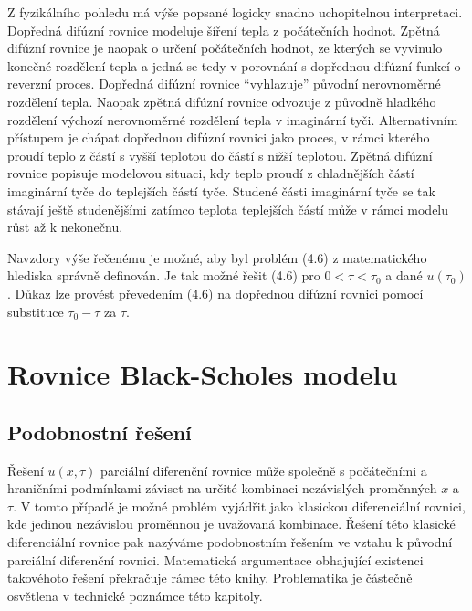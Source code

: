 \documentclass[a4paper]{book}
\begin{document}
Z fyzikálního pohledu má výše popsané logicky snadno uchopitelnou interpretaci. Dopředná difúzní rovnice modeluje šíření tepla z počátečních hodnot. Zpětná difúzní rovnice je naopak o určení počátečních hodnot, ze kterých se vyvinulo konečné rozdělení tepla a jedná se tedy v porovnání s dopřednou difúzní funkcí o reverzní proces. Dopředná difúzní rovnice ``vyhlazuje'' původní nerovnoměrné rozdělení tepla. Naopak zpětná difúzní rovnice odvozuje z původně hladkého rozdělení výchozí nerovnoměrné rozdělení tepla v imaginární tyči. Alternativním přístupem je chápat dopřednou difúzní rovnici jako proces, v rámci kterého proudí teplo z částí s vyšší teplotou do částí s nižší teplotou. Zpětná difúzní rovnice popisuje modelovou situaci, kdy teplo proudí z chladnějších částí imaginární tyče do teplejších částí tyče. Studené části imaginární tyče se tak stávají ještě studenějšími zatímco teplota teplejších částí může v rámci modelu růst až k nekonečnu.

Navzdory výše řečenému je možné, aby byl problém (4.6) z matematického hlediska správně definován. Je tak možné řešit (4.6) pro $0 < \tau < \tau_0$ a dané $u(\tau_0)$. Důkaz lze provést převedením (4.6) na dopřednou difúzní rovnici pomocí substituce $\tau_0 - \tau$ za $\tau$. 

\chapter{Rovnice Black-Scholes modelu}

\section{Podobnostní řešení}

Řešení $u(x, \tau)$ parciální diferenční rovnice může společně s počátečními a hraničními podmínkami záviset na určité kombinaci nezávislých proměnných $x$ a $\tau$. V tomto případě je možné problém vyjádřit jako klasickou diferenciální rovnici, kde jedinou nezávislou proměnnou je uvažovaná kombinace. Řešení této klasické diferenciální rovnice pak nazýváme podobnostním řešením ve vztahu k původní parciální diferenční rovnici. Matematická argumentace obhajující existenci takovéhoto řešení překračuje rámec této knihy. Problematika je částečně osvětlena v technické poznámce této kapitoly.\\
\end{document}
